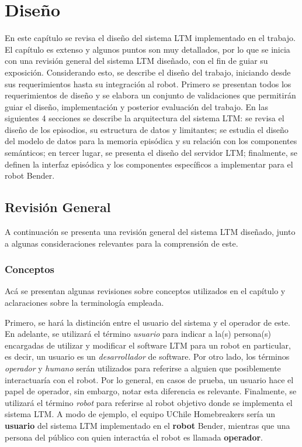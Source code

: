 \chapter{Diseño}\label{chapter:diseno}

En este capítulo se revisa el diseño del sistema LTM implementado en el trabajo. El capítulo es extenso y algunos puntos son muy detallados, por lo que se inicia con una revisión general del sistema LTM diseñado, con el fin de guiar su exposición. Considerando esto, se describe el diseño del trabajo, iniciando desde sus requerimientos hasta su integración al robot. Primero se presentan todos los requerimientos de diseño y se elabora un conjunto de validaciones que permitirán guiar el diseño, implementación y posterior evaluación del trabajo. En las siguientes 4 secciones se describe la arquitectura del sistema LTM: se revisa el diseño de los episodios, su estructura de datos y limitantes; se estudia el diseño del modelo de datos para la memoria episódica y su relación con los componentes semánticos; en tercer lugar, se presenta el diseño del servidor LTM; finalmente, se definen la interfaz episódica y los componentes específicos a implementar para el robot Bender.


\section{Revisión General}

A continuación se presenta una revisión general del sistema LTM diseñado, junto a algunas consideraciones relevantes para la comprensión de este.

\subsection{Conceptos}

Acá se presentan algunas revisiones sobre conceptos utilizados en el capítulo y aclaraciones sobre la terminología empleada.

Primero, se hará la distinción entre el usuario del sistema y el operador de este. En adelante, se utilizará el término \textit{usuario} para indicar a la(s) persona(s) encargadas de utilizar y modificar el software LTM para un robot en particular, es decir, un usuario es un \textit{desarrollador} de software. Por otro lado, los términos \textit{operador} y \textit{humano} serán utilizados para referirse a alguien que posiblemente interactuaría con el robot. Por lo general, en casos de prueba, un usuario hace el papel de operador, sin embargo, notar esta diferencia es relevante. Finalmente, se utilizará el término \textit{robot} para referirse al robot objetivo donde se implementa el sistema LTM. A modo de ejemplo, el equipo UChile Homebreakers sería un \textbf{usuario} del sistema LTM implementado en el \textbf{robot} Bender, mientras que una persona del público con quien interactúa el robot es llamada \textbf{operador}.

